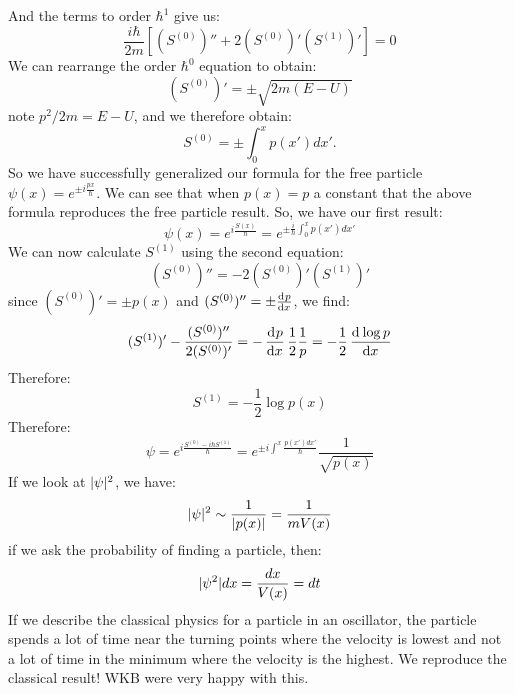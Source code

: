 And the terms to order $\hbar^1$ give us:
\begin{equation}
    \frac{i\hbar}{2m}\left[(S^{(0)})'' + 2(S^{(0)})'(S^{(1)})'\right] = 0
\end{equation}
We can rearrange the order $\hbar^0$ equation to obtain:
\begin{equation}
    (S^{(0)})' = \pm \sqrt{2m(E - U)}
\end{equation}
note $p^2/2m = E - U$, and we therefore obtain:
\begin{equation}
    S^{(0)} = \pm \int_0^x p(x') dx'.
\end{equation} 
So we have successfully generalized our formula for the free particle $\psi(x) = e^{\pm i \frac{px}{\hbar}}$. We can see that when $p(x) = p$ a constant that the above formula reproduces the free particle result. So, we have our first result:
\begin{equation}
    \psi(x) = e^{i\frac{S(x)}{\hbar}} = e^{\pm\frac{i}{\hbar}\int_0^x p(x')dx'}
\end{equation}
We can now calculate $S^{(1)}$ using the second equation:
\begin{equation}
    (S^{(0)})'' = - 2(S^{(0)})'(S^{(1)})'
\end{equation}
since $(S^{(0)})' = \pm p(x)$ and $(S^{(0)})'' = \pm \od{p}{x}$, we find:
\begin{equation}
    (S^{(1)})'  -\frac{(S^{(0)})''}{2(S^{(0)})'} = -\dod{p}{x}\frac{1}{2}\frac{1}{p} = -\frac{1}{2}\dod{\log p}{x}
\end{equation}
Therefore:
\begin{equation}
    S^{(1)} = -\frac{1}{2}\log p(x)
\end{equation}
Therefore:
\begin{equation}
    \psi = e^{i\frac{S^{(0)} - i\hbar S^{(1)}}{\hbar}} = e^{\pm i \int^x \frac{p(x')dx'}{\hbar}}\frac{1}{\sqrt{p(x)}}
\end{equation}
If we look at $\lvert \psi \rvert^2$, we have:
\begin{equation}
    \lvert \psi \rvert^2 \sim \frac{1}{\lvert p(x) \rvert} = \frac{1}{mV(x)}
\end{equation}
if we ask the probability of finding a particle, then:
\begin{equation}
    \lvert \psi^2 \rvert dx = \frac{dx}{V(x)} = dt
\end{equation}
If we describe the classical physics for a particle in an oscillator, the particle spends a lot of time near the turning points where the velocity is lowest and not a lot of time in the minimum where the velocity is the highest. We reproduce the classical result! WKB were very happy with this.


